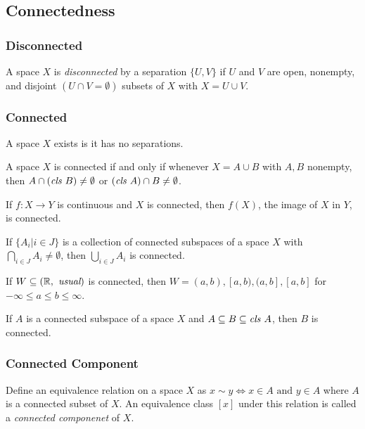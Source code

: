 \subsection{Connectedness}\label{connectedness}

\subsubsection{Disconnected}\label{disconnected}
A space $X$ is \emph{disconnected} by a separation $\{ U,V \}$ if $U$ and $V$ are open, nonempty, and disjoint $(U \cap V = \emptyset)$ subsets
of $X$ with $X=U \cup V$.

\subsubsection{Connected}\label{connected}
A space $X$ exists is it has no separations.

\begin{theorem}
A space $X$ is connected if and only if whenever $X = A \cup B$ with $A, B$ nonempty, then $A \cap (\emph{cls } B) \neq \emptyset$ or
$(\emph{cls }A) \cap B \neq \emptyset$.
\end{theorem}

\begin{theorem}
If $f:X \rightarrow Y$ is continuous and $X$ is connected, then $f(X)$, the image of $X$ in $Y$, is connected.
\end{theorem}

\begin{lemma}
\label{connectedunion}
If $\{ A_i | i \in J \}$ is a collection of connected subspaces of a space $X$ with $\bigcap_{i \in J} A_i \neq \emptyset$, then $\bigcup_{i \in J} A_i$ is connected.
\end{lemma}

\begin{proposition}
If $W \subseteq (\mathbb{R}, \emph{ usual})$ is connected, then $W = (a,b),[a,b),(a,b],[a,b]$ for $-\infty \leq a \leq b \leq \infty$.
\end{proposition}

\begin{proposition}
If $A$ is a connected subspace of a space $X$ and $A \subseteq B \subseteq \emph{cls } A$, then $B$ is connected.
\end{proposition}

\subsubsection{Connected Component}\label{connectedcomponent}
Define an equivalence relation on a space $X$ as $x \sim y \Leftrightarrow x \in A \textrm{ and } y \in A$ where $A$ is a connected subset of $X$.
An equivalence class $[x]$ under this relation is called a \emph{connected componenet} of $X$.

